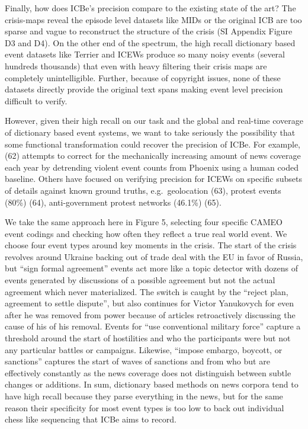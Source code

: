 \documentclass{article}
\begin{document}
Finally, how does ICBe's precision compare to the existing state of the
art? The crisis-maps reveal the episode level datasets like MIDs or the
original ICB are too sparse and vague to reconstruct the structure of
the crisis (SI Appendix Figure D3 and D4). On the other end of the
spectrum, the high recall dictionary based event datasets like Terrier
and ICEWs produce so many noisy events (several hundreds thousands) that
even with heavy filtering their crisis maps are completely
unintelligible. Further, because of copyright issues, none of these
datasets directly provide the original text spans making event level
precision difficult to verify.

However, given their high recall on our task and the global and
real-time coverage of dictionary based event systems, we want to take
seriously the possibility that some functional transformation could
recover the precision of ICBe. For example, (62) attempts to correct for
the mechanically increasing amount of news coverage each year by
detrending violent event counts from Phoenix using a human coded
baseline. Others have focused on verifying precision for ICEWs on
specific subsets of details against known ground truths,
e.g.~geolocation (63), protest events (80\%) (64), anti-government
protest networks (46.1\%) (65).

We take the same approach here in Figure 5, selecting four specific
CAMEO event codings and checking how often they reflect a true real
world event. We choose four event types around key moments in the
crisis. The start of the crisis revolves around Ukraine backing out of
trade deal with the EU in favor of Russia, but ``sign formal agreement''
events act more like a topic detector with dozens of events generated by
discussions of a possible agreement but not the actual agreement which
never materialized. The switch is caught by the ``reject plan, agreement
to settle dispute'', but also continues for Victor Yanukovych for even
after he was removed from power because of articles retroactively
discussing the cause of his of his removal. Events for ``use
conventional military force'' capture a threshold around the start of
hostilities and who the participants were but not any particular battles
or campaigns. Likewise, ``impose embargo, boycott, or sanctions''
captures the start of waves of sanctions and from who but are
effectively constantly as the news coverage does not distinguish between
subtle changes or additions. In sum, dictionary based methods on news
corpora tend to have high recall because they parse everything in the
news, but for the same reason their specificity for most event types is
too low to back out individual chess like sequencing that ICBe aims to
record.
\end{document}
